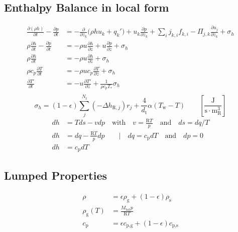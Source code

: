 \subsection{Enthalpy Balance in local form}
\begin{equation}
    \label{app:eq:enthalpy-balance}
    \begin{aligned}
        \frac{\partial (\rho h)}{\partial t} - \frac{\partial p }{\partial t} &= 
        -\frac{\partial}{\partial z_k} \bigg (\rho h u_k + q_k' \bigg) + 
        u_k \frac{\partial p}{\partial z_k} + \sum_i j_{k,i} f_{k,i} -
        \Pi_{j,k} \frac{\partial u_j}{\partial z_k} + \sigma_h \\
        \rho \frac{\partial h}{\partial t} - \frac{\partial p}{\partial t} &=
        - \rho u \frac{\partial h}{\partial z} + u \frac{\partial p}{\partial z} + \sigma_h \\
        \rho \frac{\partial h}{\partial t} &= - \rho u \frac{\partial h}{\partial z} + \sigma_h \\
        \rho c_p \frac{\partial T}{\partial t} &= - \rho u c_p \frac{\partial T}{\partial z} + \sigma_h \\
        \frac{\partial T'}{\partial t} &= - u \frac{\partial T'}{\partial z} + \frac{1}{\rho c_p T_*} \sigma_h \\
    \end{aligned}
\end{equation}
\begin{equation}
    \label{app:eq:enthalpy-soruce-term}
    \sigma_h = (1-\epsilon) \sum_j^{N_\text{r}} (-\Delta h_{\text{R},j})r_j
        + \frac{4}{d_\text{t}} \alpha (T_\text{w} - T) 
        \quad \quad \left[ \frac{\si{\joule}}{\si{\second} \cdot \si{\meter}_\text{R}^3} \right]
\end{equation}
\begin{equation}
    \label{app:eq:differential-of-enthalpy}
    \begin{aligned}
        dh &= T ds - v dp \quad \text{with} \quad v = \frac{\text{R}T}{p}
        \quad \text{and} \quad ds = dq/T \\
        dh &= dq - \frac{\text{R}T}{p}dp \quad \quad \Big | \quad dq = c_\text{p}dT \quad \text{and} \quad dp = 0 \\
        dh &= c_\text{p}dT
    \end{aligned}
\end{equation}

\subsection{Lumped Properties}
\begin{equation}
    \label{app:eq:lumped-properties}
    \begin{aligned}
        \rho &= \epsilon \rho_\text{g} + (1-\epsilon) \rho_\text{s} \\
        \rho_\text{g}(T) &= \frac{M_\text{tot} p}{\text{R}T} \\
        c_\text{p} &= \epsilon c_\text{p,g} + (1-\epsilon) c_\text{p,s}
    \end{aligned}
\end{equation}

